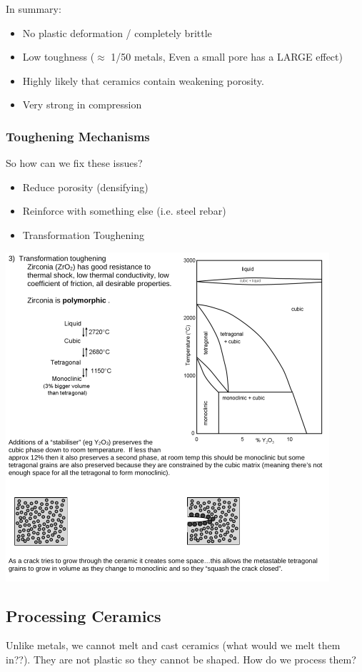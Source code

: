 \documentclass[12pt]{article}
\begin{document}
In summary:
\begin{itemize}
  \item No plastic deformation / completely brittle
  \item Low toughness ($\approx$ 1/50 metals, Even a small pore has a LARGE effect)
  \item Highly likely that ceramics contain weakening porosity. 
  \item Very strong in compression
\end{itemize}

\subsubsection{Toughening Mechanisms}
So how can we fix these issues?

\begin{itemize}
  \item Reduce porosity (densifying)
  \item Reinforce with something else (i.e. steel rebar)
  \item Transformation Toughening
\end{itemize}

\includegraphics[scale=0.6]{transformationtoughening}

\subsection{Processing Ceramics}
Unlike metals, we cannot melt and cast ceramics (what would we melt them in??).
They are not plastic so they cannot be shaped. 
How do we process them?
\end{document}
